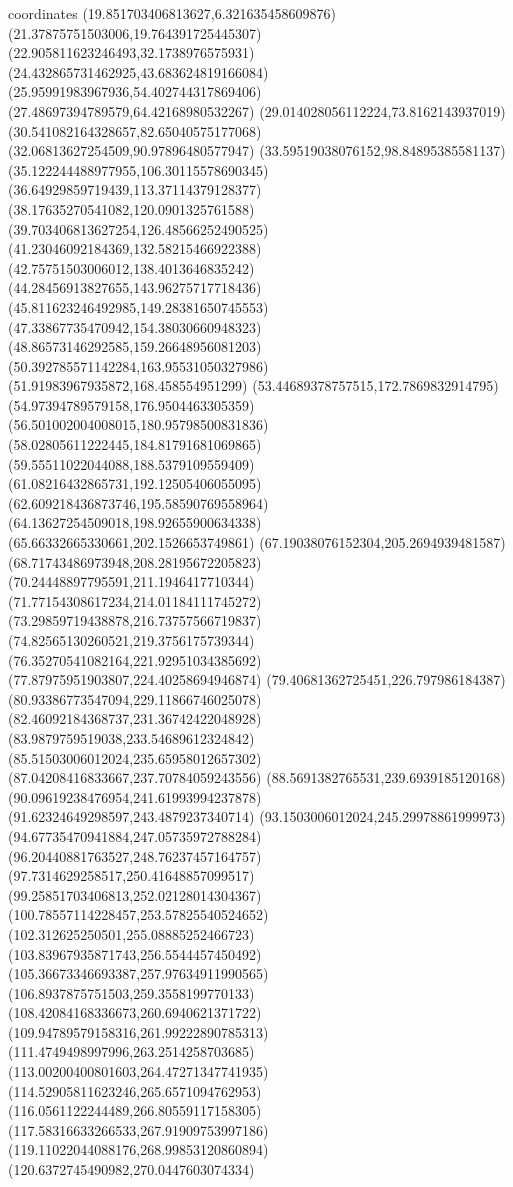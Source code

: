 coordinates {%
(19.851703406813627,6.321635458609876)
(21.37875751503006,19.764391725445307)
(22.905811623246493,32.1738976575931)
(24.432865731462925,43.683624819166084)
(25.95991983967936,54.402744317869406)
(27.48697394789579,64.42168980532267)
(29.014028056112224,73.8162143937019)
(30.541082164328657,82.65040575177068)
(32.06813627254509,90.97896480577947)
(33.59519038076152,98.84895385581137)
(35.122244488977955,106.30115578690345)
(36.64929859719439,113.37114379128377)
(38.17635270541082,120.0901325761588)
(39.703406813627254,126.48566252490525)
(41.23046092184369,132.58215466922388)
(42.75751503006012,138.4013646835242)
(44.28456913827655,143.96275717718436)
(45.811623246492985,149.28381650745553)
(47.33867735470942,154.38030660948323)
(48.86573146292585,159.26648956081203)
(50.392785571142284,163.95531050327986)
(51.91983967935872,168.458554951299)
(53.44689378757515,172.7869832914795)
(54.97394789579158,176.9504463305359)
(56.501002004008015,180.95798500831836)
(58.02805611222445,184.81791681069865)
(59.55511022044088,188.5379109559409)
(61.08216432865731,192.12505406055095)
(62.609218436873746,195.58590769558964)
(64.13627254509018,198.92655900634338)
(65.66332665330661,202.1526653749861)
(67.19038076152304,205.2694939481587)
(68.71743486973948,208.28195672205823)
(70.24448897795591,211.1946417710344)
(71.77154308617234,214.01184111745272)
(73.29859719438878,216.73757566719837)
(74.82565130260521,219.3756175739344)
(76.35270541082164,221.92951034385692)
(77.87975951903807,224.40258694946874)
(79.40681362725451,226.797986184387)
(80.93386773547094,229.11866746025078)
(82.46092184368737,231.36742422048928)
(83.9879759519038,233.54689612324842)
(85.51503006012024,235.65958012657302)
(87.04208416833667,237.70784059243556)
(88.5691382765531,239.6939185120168)
(90.09619238476954,241.61993994237878)
(91.62324649298597,243.4879237340714)
(93.1503006012024,245.29978861999973)
(94.67735470941884,247.05735972788284)
(96.20440881763527,248.76237457164757)
(97.7314629258517,250.41648857099517)
(99.25851703406813,252.02128014304367)
(100.78557114228457,253.57825540524652)
(102.312625250501,255.08885252466723)
(103.83967935871743,256.5544457450492)
(105.36673346693387,257.97634911990565)
(106.8937875751503,259.3558199770133)
(108.42084168336673,260.6940621371722)
(109.94789579158316,261.99222890785313)
(111.4749498997996,263.2514258703685)
(113.00200400801603,264.47271347741935)
(114.52905811623246,265.6571094762953)
(116.0561122244489,266.80559117158305)
(117.58316633266533,267.91909753997186)
(119.11022044088176,268.99853120860894)
(120.6372745490982,270.0447603074334)
}
